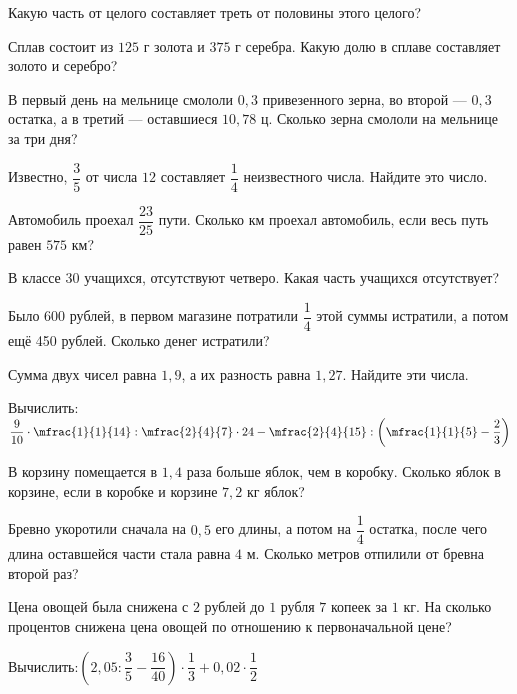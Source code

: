 %
%
\begin{homework}[number=3]
	\begin{listofex}
		\item Какую часть от целого составляет треть от половины этого целого?
		\item Сплав состоит из \(125\) г золота и \(375\) г серебра. Какую долю в сплаве составляет золото и серебро?
		\item В первый день на мельнице смололи \(0,3\) привезенного зерна, во второй --- \(0,3\) остатка, а в третий --- оставшиеся \(10,78\) ц. Сколько зерна смололи на мельнице за три дня?
		\item Известно, \(\dfrac{3}{5}\) от числа \(12\) составляет \(\dfrac{1}{4}\) неизвестного числа. Найдите это число.
		\item Автомобиль проехал \(\dfrac{23}{25}\) пути. Сколько км проехал автомобиль, если весь путь равен \(575\) км?
		\item В классе  \(30\)  учащихся, отсутствуют четверо. Какая часть учащихся отсутствует?
		\item Было  \(600\)  рублей, в первом магазине потратили \(\dfrac{1}{4}\) этой суммы истратили, а потом ещё 450 рублей. Сколько денег истратили?
		\item Сумма двух чисел равна \(1,9\), а их разность равна \(1,27\). Найдите эти числа.
		\item Вычислить:\quad\( \dfrac{9}{10} \cdot \mfrac{1}{1}{14} : \mfrac{2}{4}{7} \cdot 24 - \mfrac{2}{4}{15} : \left( \mfrac{1}{1}{5} - \dfrac{2}{3} \right) \)
	\end{listofex}
\end{homework}

%
%
\begin{class}[number=7]
	\begin{listofex}
		\item В корзину помещается в \(1,4\) раза больше яблок, чем в коробку. Сколько яблок в корзине, если в коробке и корзине \( 7,2\) кг яблок?
		\item Бревно укоротили сначала на \(0,5\) его длины, а потом на \(\dfrac{1}{4}\) остатка, после чего длина оставшейся части стала равна \(4\) м. Сколько метров отпилили от бревна второй раз?
		\item Цена овощей была снижена с \(2\) рублей до \(1\) рубля \(7\) копеек за \(1\) кг. На сколько процентов снижена цена овощей по отношению к первоначальной цене?
		\item Вычислить:\quad\(\left(2,05:\dfrac{3}{5}-\dfrac{16}{40}\right) \cdot \dfrac{1}{3} + 0,02 \cdot \dfrac{1}{2}\)
	\end{listofex}
\end{class}

